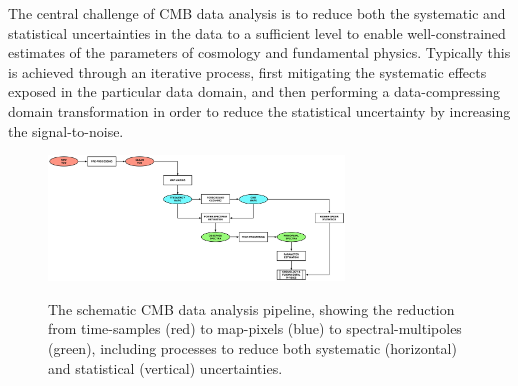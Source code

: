 The central challenge of CMB data analysis is to reduce both the systematic and statistical uncertainties in the data to a sufficient level to enable well-constrained estimates of the parameters of cosmology and fundamental physics. Typically this is achieved through an iterative process, first mitigating the systematic effects exposed in the particular data domain, and then performing a data-compressing domain transformation in order to reduce the statistical uncertainty by increasing the signal-to-noise.

\begin{figure}[htbp]
\includegraphics[width=0.7\textwidth]{Analysis/da}\\
\caption{The schematic CMB data analysis pipeline, showing the reduction from time-samples (red) to map-pixels (blue) to spectral-multipoles (green), including processes to reduce both systematic (horizontal) and statistical (vertical) uncertainties.}
\label{fig_da}
\end{figure}

